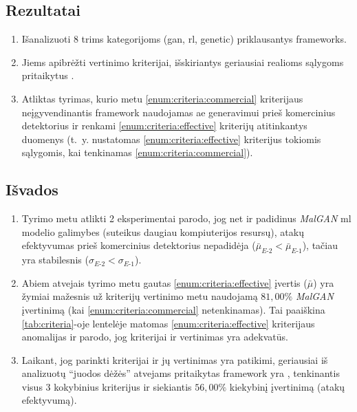 
\subsection*{Rezultatai}
\begin{enumerate}
    \item Išanalizuoti 8 trims kategorijoms (\acs{gan}, \acs{rl}, \acs{genetic}) priklausantys  \glspl{framework}. 
    \item Jiems apibrėžti vertinimo kriterijai, išskiriantys geriausiai realioms sąlygoms pritaikytus .
    \item Atliktas tyrimas, kurio metu \ref{enum:criteria:commercial} kriterijaus neįgyvendinantis \gls{framework}  naudojamas \acs{ae} generavimui prieš komercinius detektorius ir renkami \ref{enum:criteria:effective} kriterijų atitinkantys duomenys (t.~y. nustatomas  \ref{enum:criteria:effective} kriterijus tokiomis sąlygomis, kai tenkinamas \ref{enum:criteria:commercial}).
\end{enumerate}

\subsection*{Išvados}
\begin{enumerate}
    \item Tyrimo metu atlikti 2 eksperimentai parodo, jog net ir padidinus \textit{MalGAN} \acs{ml} modelio galimybes (suteikus daugiau kompiuterijos resursų), atakų efektyvumas prieš komercinius detektorius nepadidėja ($\bar{\mu}_{E \text{-} 2} < \bar{\mu}_{E \text{-} 1}$), tačiau yra stabilesnis ($\sigma_{E \text{-} 2} < \sigma_{E \text{-} 1}$).
    \item Abiem atvejais tyrimo metu gautas \ref{enum:criteria:effective} įvertis ($\bar{\mu}$) yra žymiai mažesnis už kriterijų vertinimo metu naudojamą $81,00 \%$ \textit{MalGAN}  įvertinimą (kai \ref{enum:criteria:commercial} netenkinamas). Tai paaiškina \ref{tab:criteria}-oje lentelėje matomas \ref{enum:criteria:effective} kriterijaus anomalijas ir parodo, jog kriterijai ir  vertinimas yra adekvatūs.
    \item Laikant, jog parinkti kriterijai ir jų vertinimas yra patikimi, geriausiai iš analizuotų  \enquote{juodos dėžės} atvejams pritaikytas \gls{framework} yra , tenkinantis visus 3 kokybinius kriterijus ir siekiantis $56,00 \%$ kiekybinį įvertinimą (atakų efektyvumą).
\end{enumerate}
